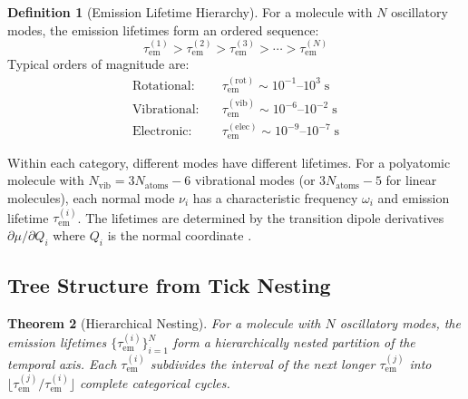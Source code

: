 \documentclass[11pt,a4paper]{article}
\newtheorem{theorem}{Theorem}[section]
\theoremstyle{definition}
\newtheorem{definition}[theorem]{Definition}
\theoremstyle{remark}
\newcommand{\tem}{\tau_{\mathrm{em}}}
\begin{document}
\begin{definition}[Emission Lifetime Hierarchy]
\label{def:lifetime_hierarchy}
For a molecule with $N$ oscillatory modes, the emission lifetimes form an ordered sequence:
\begin{equation}
\tem^{(1)} > \tem^{(2)} > \tem^{(3)} > \cdots > \tem^{(N)}
\label{eq:lifetime_ordering}
\end{equation}
Typical orders of magnitude are:
\begin{align}
\text{Rotational:} \quad & \tem^{(\mathrm{rot})} \sim 10^{-1} \text{--} 10^{3} \;\mathrm{s} \label{eq:rot_lifetime} \\
\text{Vibrational:} \quad & \tem^{(\mathrm{vib})} \sim 10^{-6} \text{--} 10^{-2} \;\mathrm{s} \label{eq:vib_lifetime} \\
\text{Electronic:} \quad & \tem^{(\mathrm{elec})} \sim 10^{-9} \text{--} 10^{-7} \;\mathrm{s} \label{eq:elec_lifetime}
\end{align}
\end{definition}

Within each category, different modes have different lifetimes. For a polyatomic molecule with $N_{\mathrm{vib}} = 3N_{\mathrm{atoms}} - 6$ vibrational modes (or $3N_{\mathrm{atoms}} - 5$ for linear molecules), each normal mode $\nu_i$ has a characteristic frequency $\omega_i$ and emission lifetime $\tem^{(i)}$. The lifetimes are determined by the transition dipole derivatives $\partial\mu/\partial Q_i$ where $Q_i$ is the normal coordinate \citep{wilson1955, herzberg1945}.

\subsection{Tree Structure from Tick Nesting}

\begin{theorem}[Hierarchical Nesting]
\label{thm:hierarchical_nesting}
For a molecule with $N$ oscillatory modes, the emission lifetimes $\{\tem^{(i)}\}_{i=1}^{N}$ form a hierarchically nested partition of the temporal axis. Each $\tem^{(i)}$ subdivides the interval of the next longer $\tem^{(j)}$ into $\lfloor \tem^{(j)}/\tem^{(i)} \rfloor$ complete categorical cycles.
\end{theorem}
\end{document}
